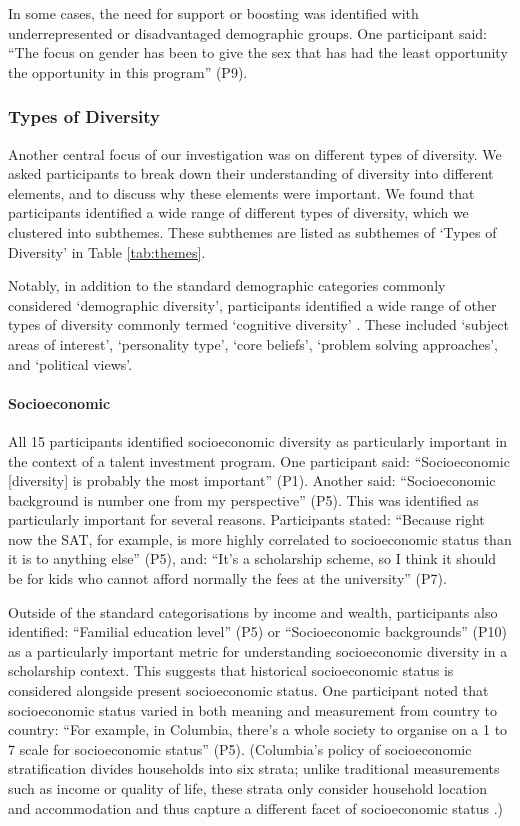 In some cases, the need for support or boosting was identified with underrepresented or disadvantaged demographic groups. One participant said: ``The focus on gender has been to give the sex that has had the least opportunity the opportunity in this program'' (P9).

\subsubsection{Types of Diversity}
Another central focus of our investigation was on different types of diversity. We asked participants to break down their understanding of diversity into different elements, and to discuss why these elements were important. We found that participants identified a wide range of different types of diversity, which we clustered into subthemes. These subthemes are listed as subthemes of `Types of Diversity' in Table \ref{tab:themes}.

Notably, in addition to the standard demographic categories commonly considered `demographic diversity', participants identified a wide range of other types of diversity commonly termed `cognitive diversity' \cite{page_diversity_2010}. These included `subject areas of interest', `personality type', `core beliefs', `problem solving approaches', and `political views'.

\paragraph{Socioeconomic}
All 15 participants identified socioeconomic diversity as particularly important in the context of a talent investment program. One participant said: ``Socioeconomic [diversity] is probably the most important'' (P1). Another said: ``Socioeconomic background is number one from my perspective'' (P5). This was identified as particularly important for several reasons. Participants stated: ``Because right now the SAT, for example, is more highly correlated to socioeconomic status than it is to anything else'' (P5), and: ``It's a scholarship scheme, so I think it should be for kids who cannot afford normally the fees at the university'' (P7).

Outside of the standard categorisations by income and wealth, participants also identified: ``Familial education level'' (P5) or ``Socioeconomic backgrounds'' (P10) as a particularly important metric for understanding socioeconomic diversity in a scholarship context. This suggests that historical socioeconomic status is considered alongside present socioeconomic status. One participant noted that socioeconomic status varied in both meaning and measurement from country to country: ``For example, in Columbia, there's a whole society to organise on a 1 to 7 scale for socioeconomic status'' (P5). (Columbia's policy of socioeconomic stratification divides households into six strata; unlike traditional measurements such as income or quality of life, these strata only consider household location and accommodation and thus capture a different facet of socioeconomic status \cite{CHICAOLMO2020102560}.)

